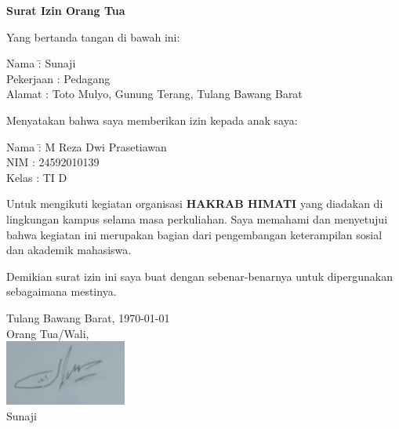 \documentclass[a4paper,12pt]{article}
\begin{document}
\begin{center}
    \Large\textbf{Surat Izin Orang Tua}
\end{center}

\vspace{0.5cm}

\noindent
Yang bertanda tangan di bawah ini:

\vspace{0.2cm}

\begin{tabbing}
    Nama \hspace{2.2cm} \= : Sunaji \\
    Pekerjaan \> : Pedagang \\
    Alamat \> : Toto Mulyo, Gunung  Terang, Tulang Bawang Barat
\end{tabbing}

\vspace{0.5cm}

\noindent
Menyatakan bahwa saya memberikan izin kepada anak saya:

\vspace{0.2cm}

\begin{tabbing}
    Nama \hspace{2.2cm} \= : M Reza Dwi Prasetiawan\\
    NIM \> : 24592010139 \\
    Kelas \> : TI D
\end{tabbing}

\vspace{0.5cm}

\noindent
Untuk mengikuti kegiatan organisasi \textbf{HAKRAB HIMATI} yang diadakan di lingkungan kampus selama masa perkuliahan. Saya memahami dan menyetujui bahwa kegiatan ini merupakan bagian dari pengembangan keterampilan sosial dan akademik mahasiswa.

\vspace{0.5cm}

\noindent
Demikian surat izin ini saya buat dengan sebenar-benarnya untuk dipergunakan sebagaimana mestinya.

\vspace{1cm}

\begin{flushright}
  \begin{minipage}{7cm}
    \centering
        Tulang Bawang Barat, \today\\
        Orang Tua/Wali,\\
        \vspace{1cm} %
        \includegraphics[width=4cm]{resources/parent_sign.jpg} \\ %
    Sunaji
  \end{minipage}
\end{flushright}
\end{document}
